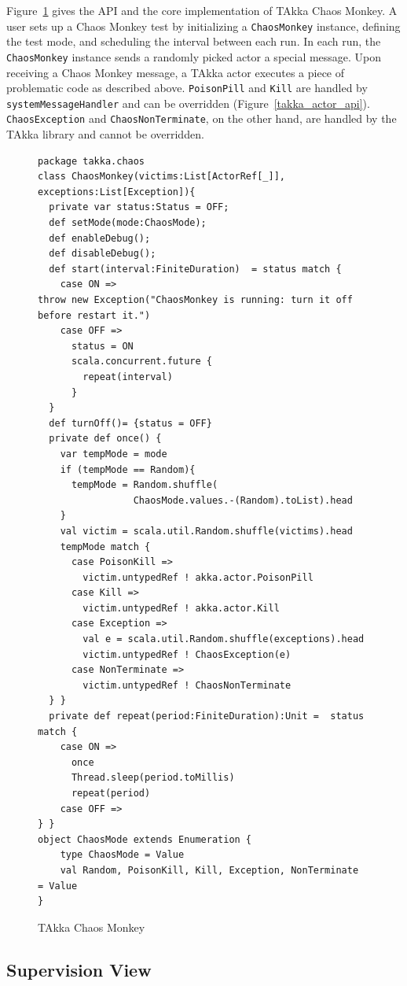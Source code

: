 Figure~\ref{chaos_api} gives the API and the core implementation of TAkka Chaos 
Monkey.  A user sets up a Chaos Monkey test by initializing a 
{\tt ChaosMonkey} instance, defining the test mode, and scheduling the interval 
between each run.  In each run, the {\tt ChaosMonkey} instance sends a 
randomly picked actor a special message.  Upon receiving a Chaos Monkey 
message, a TAkka actor executes a piece of problematic code as described above.  
{\tt PoisonPill} and {\tt Kill} are handled by {\tt 
systemMessageHandler} and can be overridden (Figure~\ref{takka_actor_api}).  
{\tt ChaosException} and {\tt ChaosNonTerminate}, on the 
other hand, are handled by the TAkka library and cannot be overridden.

\begin{figure}[p]

\begin{lstlisting}
package takka.chaos
class ChaosMonkey(victims:List[ActorRef[_]], exceptions:List[Exception]){
  private var status:Status = OFF;
  def setMode(mode:ChaosMode);
  def enableDebug();
  def disableDebug();
  def start(interval:FiniteDuration)  = status match {
    case ON => 
throw new Exception("ChaosMonkey is running: turn it off before restart it.") 
    case OFF =>
      status = ON
      scala.concurrent.future {
        repeat(interval)
      }
  }
  def turnOff()= {status = OFF}
  private def once() {
    var tempMode = mode
    if (tempMode == Random){
      tempMode = Random.shuffle(
                 ChaosMode.values.-(Random).toList).head
    }
    val victim = scala.util.Random.shuffle(victims).head
    tempMode match {
      case PoisonKill =>
        victim.untypedRef ! akka.actor.PoisonPill
      case Kill =>
        victim.untypedRef ! akka.actor.Kill
      case Exception =>
        val e = scala.util.Random.shuffle(exceptions).head
        victim.untypedRef ! ChaosException(e)
      case NonTerminate =>
        victim.untypedRef ! ChaosNonTerminate   
  } }
  private def repeat(period:FiniteDuration):Unit =  status match {
    case ON =>
      once
      Thread.sleep(period.toMillis)
      repeat(period)      
    case OFF =>
} } 
object ChaosMode extends Enumeration {
    type ChaosMode = Value
    val Random, PoisonKill, Kill, Exception, NonTerminate  = Value
}
\end{lstlisting}
\caption{TAkka Chaos Monkey}
\label{chaos_api}
\end{figure}


\subsection{Supervision View}


